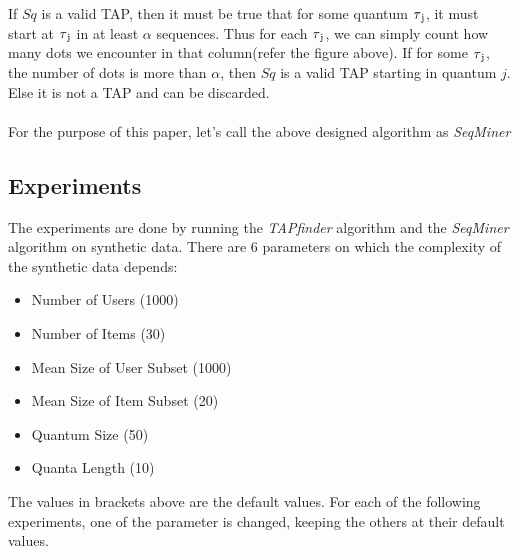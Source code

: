 \documentclass{article}
\begin{document}
\begin{itemize}
\begin{center}
\end{center}

\end{itemize}
If $Sq$ is a valid TAP, then it must be true that for some quantum $\tau\textsubscript{j}$, it must start at $\tau\textsubscript{j}$ in at least $\alpha$ sequences. Thus for each $\tau\textsubscript{j}$, we can simply count how many dots we encounter in that column(refer the figure above). If for some $\tau\textsubscript{j}$, the number of dots is more than $\alpha$, then $Sq$ is a valid TAP starting in quantum $j$. Else it is not a TAP and can be discarded. \\ \\
For the purpose of this paper, let's call the above designed algorithm as \textit{\mbox{SeqMiner}}
\subsection{Experiments}
The experiments are done by running the \textit{\mbox{TAPfinder}} algorithm and the \textit{\mbox{SeqMiner}} algorithm on synthetic data. There are 6 parameters on which the complexity of the synthetic data depends:
\begin{itemize}
    \item Number of Users (1000)
    \item Number of Items (30)
    \item Mean Size of User Subset (1000)
    \item Mean Size of Item Subset (20)
    \item Quantum Size (50)
    \item Quanta Length (10)
\end{itemize}
The values in brackets above are the default values. For each of the following experiments, one of the parameter is changed, keeping the others at their default values.
\end{document}
